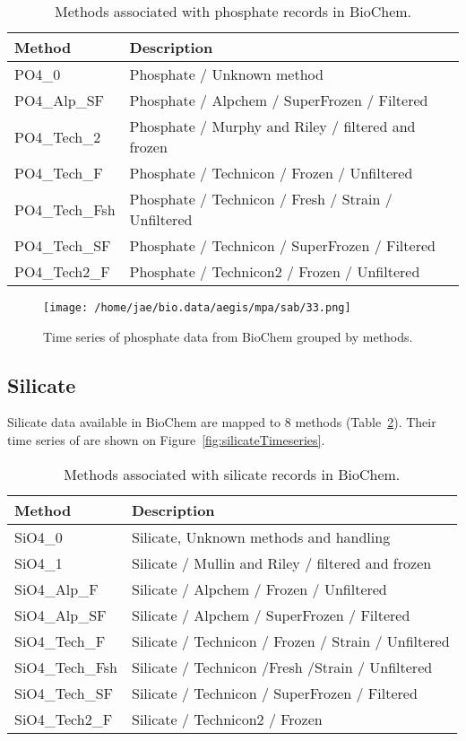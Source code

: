 \documentclass[letterpaper,portrait,11pt]{scrartcl}
\numberwithin{equation}{section}    %
\numberwithin{figure}{section}    %
\numberwithin{table}{section}       %
\begin{document}
\begin{appendices}
\begin{table}[h]
  \caption{Methods associated with phosphate records in BioChem.}
  \label{table:PhosphateMethods}
  \begin{tabular}{ll}
    Method & Description \\ \hline
    PO4\_0 & Phosphate / Unknown method  \\
    PO4\_Alp\_SF & Phosphate / Alpchem / SuperFrozen / Filtered \\
    PO4\_Tech\_2 & Phosphate / Murphy and Riley / filtered and frozen \\
    PO4\_Tech\_F & Phosphate / Technicon / Frozen / Unfiltered \\
    PO4\_Tech\_Fsh & Phosphate / Technicon / Fresh / Strain / Unfiltered \\
    PO4\_Tech\_SF & Phosphate / Technicon / SuperFrozen / Filtered \\
    PO4\_Tech2\_F & Phosphate / Technicon2 / Frozen / Unfiltered \\
  \end{tabular}
\end{table}


\begin{figure}[h]
  \centering
  \texttt{[image: /home/jae/bio.data/aegis/mpa/sab/33.png]}
  \caption{Time series of phosphate data from BioChem grouped by methods.}
  \label{fig:PhosphateTimeseries}
\end{figure}


\subsection{Silicate}

Silicate data available in BioChem are mapped to 8 methods (Table~\ref{table:SilicateMethods}). Their time series of are shown on Figure~\ref{fig:silicateTimeseries}.

\begin{table}[h]
  \label{table:SilicateMethods}
  \caption{Methods associated with silicate records in BioChem.}
  \begin{tabular}{ll}
    Method & Description \\ \hline
    SiO4\_0 & Silicate, Unknown methods and handling \\
    SiO4\_1 & Silicate / Mullin and Riley / filtered and frozen \\
    SiO4\_Alp\_F & Silicate / Alpchem / Frozen / Unfiltered \\
    SiO4\_Alp\_SF & Silicate / Alpchem / SuperFrozen / Filtered \\
    SiO4\_Tech\_F & Silicate / Technicon / Frozen / Strain / Unfiltered \\
    SiO4\_Tech\_Fsh & Silicate / Technicon /Fresh /Strain / Unfiltered \\
    SiO4\_Tech\_SF & Silicate / Technicon / SuperFrozen / Filtered \\
    SiO4\_Tech2\_F & Silicate / Technicon2 / Frozen \\
  \end{tabular}
\end{table}



\end{appendices}
\end{document}

